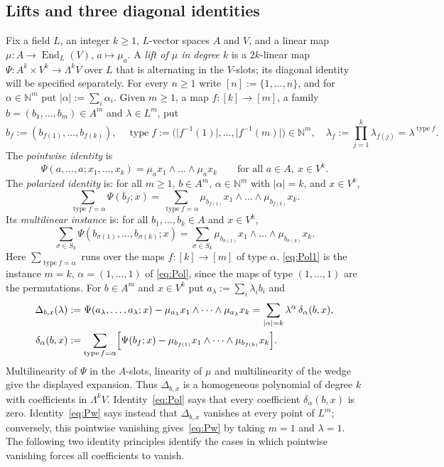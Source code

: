 \documentclass[11pt]{amsart}
\theoremstyle{definition}
\theoremstyle{remark}
\numberwithin{equation}{section}
\newcommand{\N}{\mathbb N}
\newcommand{\End}{\operatorname{End}}
\newcommand{\abs}[1]{\lvert #1\rvert}
\newcommand{\type}{\operatorname{type}}
\theoremstyle{plain}
\theoremstyle{definition}
\theoremstyle{plain}
\begin{document}
\subsection{Lifts and three diagonal identities}\label{ssec:diag}
Fix a field $L$, an integer $k\ge1$, $L$\nobreakdash-vector spaces $A$ and $V$, and a linear map $\mu\colon A\to\End_L(V)$,
$a\mapsto \mu_a$. A \emph{lift of $\mu$ in degree $k$} is a $2k$\nobreakdash-linear map $\Psi\colon A^k\times V^k\to\Lambda^kV$ over $L$ that is
alternating in the $V$\nobreakdash-slots; its diagonal identity will be specified separately. For every $n\ge1$ write
$[n]:=\{1,\dots,n\}$, and for $\alpha\in\N^m$ put $\abs\alpha:=\sum_i\alpha_i$. Given $m\ge1$, a map
$f\colon[k]\to[m]$, a family $b=(b_1,\dots,b_m)\in A^m$ and $\lambda\in L^m$, put
\[
b_f:=(b_{f(1)},\dots,b_{f(k)}),\quad \type f:=\bigl(\abs{f^{-1}(1)},\dots,\abs{f^{-1}(m)}\bigr)\in\N^m,\quad
\lambda_f:=\prod_{j=1}^k\lambda_{f(j)}=\lambda^{\type f}.
\]
The \emph{pointwise identity} is
\begin{equation*}\tag{Pw}\label{eq:Pw}
\Psi(a,\dots,a;x_1,\dots,x_k)=\mu_ax_1\wedge\dots\wedge \mu_ax_k\qquad\text{for all }a\in A,\ x\in V^k.
\end{equation*}
The \emph{polarized identity} is: for all $m\ge1$, $b\in A^m$, $\alpha\in\N^m$ with $\abs\alpha=k$, and $x\in V^k$,
\begin{equation*}\tag{Pol}\label{eq:Pol}
\sum_{\type f=\alpha}\Psi(b_f;x)=\sum_{\type f=\alpha}\mu_{b_{f(1)}}x_1\wedge\dots\wedge \mu_{b_{f(k)}}x_k .
\end{equation*}
Its \emph{multilinear instance} is: for all $b_1,\dots,b_k\in A$ and $x\in V^k$,
\begin{equation*}\tag{Pol1}\label{eq:Pol1}
\sum_{\sigma\in S_k}\Psi(b_{\sigma(1)},\dots,b_{\sigma(k)};x)
=\sum_{\sigma\in S_k}\mu_{b_{\sigma(1)}}x_1\wedge\dots\wedge \mu_{b_{\sigma(k)}}x_k .
\end{equation*}
Here $\sum_{\type f=\alpha}$ runs over the maps $f\colon[k]\to[m]$ of type $\alpha$. \eqref{eq:Pol1} is the instance $m=k$,
$\alpha=(1,\dots,1)$ of \eqref{eq:Pol}, since the maps of type $(1,\dots,1)$ are the permutations. For $b\in A^m$ and
$x\in V^k$ put $a_\lambda:=\sum_i\lambda_ib_i$ and
\begin{align*}
\Delta_{b,x}(\lambda)&:=\Psi(a_\lambda,\dots,a_\lambda;x)-\mu_{a_\lambda}x_1\wedge\dots\wedge \mu_{a_\lambda}x_k
=\sum_{\abs\alpha=k}\lambda^\alpha\,\delta_\alpha(b,x),\\
\delta_\alpha(b,x)&:=\sum_{\type f=\alpha}\Bigl[\Psi(b_f;x)-\mu_{b_{f(1)}}x_1\wedge\dots\wedge \mu_{b_{f(k)}}x_k\Bigr].
\end{align*}
Multilinearity of $\Psi$ in the $A$\nobreakdash-slots, linearity of $\mu$ and multilinearity of the wedge give the displayed
expansion. Thus $\Delta_{b,x}$ is a homogeneous polynomial of degree $k$ with coefficients in $\Lambda^kV$.
Identity~\eqref{eq:Pol} says that every coefficient $\delta_\alpha(b,x)$ is zero. Identity~\eqref{eq:Pw} says instead that
$\Delta_{b,x}$ vanishes at every point of $L^m$; conversely, this pointwise vanishing gives~\eqref{eq:Pw} by taking
$m=1$ and $\lambda=1$. The following two identity principles identify the cases in which pointwise vanishing forces
all coefficients to vanish.
\end{document}
